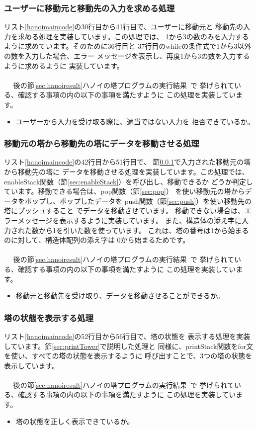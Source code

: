 \documentclass[a4j]{jarticle}
\begin{document}
\subsubsection{ユーザーに移動元と移動先の入力を求める処理}
\label{sec:movetowerinput}
リスト\ref{hanoimaincode}の30行目から41行目で、ユーザーに移動元と
移動先の入力を求める処理を実装しています。この処理では、
1から3の数のみを入力するように求めています。そのために36行目と
37行目のwhileの条件式で1から3以外の数を入力した場合、エラー
メッセージを表示し、再度1から3の数を入力するように求めるように
実装しています。
\\\\~~
後の節\ref{sec:hanoiresult}ハノイの塔プログラムの実行結果~で
挙げられている、確認する事項の内の以下の事項を満たすように
この処理を実装しています。
\begin{itemize}
  \item ユーザーから入力を受け取る際に、適当ではない入力を
        拒否できているか。
\end{itemize}

\subsubsection{移動元の塔から移動先の塔にデータを移動させる処理}
リスト\ref{hanoimaincode}の42行目から51行目で、
節\ref{sec:movetowerinput}で入力された移動元の塔から移動先の塔に
データを移動させる処理を実装しています。この処理では、
enableStack関数（節\ref{sec:enableStack}）を呼び出し、移動できるか
どうか判定しています。移動できる場合は、pop関数（節\ref{sec:pop}）
を使い移動元の塔からデータをポップし、ポップしたデータを
push関数（節\ref{sec:push}）を使い移動先の塔にプッシュすること
でデータを移動させています。
移動できない場合は、エラーメッセージを表示するように実装しています。
また、構造体の添え字に入力された数から1を引いた数を使っています。
これは、塔の番号は1から始まるのに対して、構造体配列の添え字は
0から始まるためです。
\\\\~~
後の節\ref{sec:hanoiresult}ハノイの塔プログラムの実行結果~で
挙げられている、確認する事項の内の以下の事項を満たすように
この処理を実装しています。
\begin{itemize}
  \item 移動元と移動先を受け取り、データを移動させることができるか。
\end{itemize}

\subsubsection{塔の状態を表示する処理}
リスト\ref{hanoimaincode}の52行目から56行目で、塔の状態を
表示する処理を実装しています。節\ref{sec:printTower}で説明した処理と
同様に、printStack関数をfor文を使い、すべての塔の状態を表示するように
呼び出すことで、3つの塔の状態を表示しています。
\\\\~~
後の節\ref{sec:hanoiresult}ハノイの塔プログラムの実行結果~で
挙げられている、確認する事項の内の以下の事項を満たすように
この処理を実装しています。
\begin{itemize}
  \item 塔の状態を正しく表示できているか。
\end{itemize}
\end{document}
